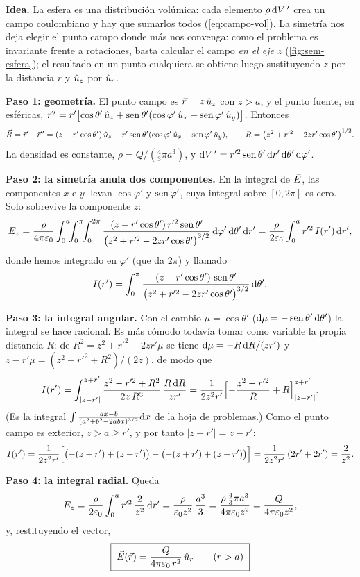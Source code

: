 \begin{resolucion}
\textbf{Idea.} La esfera es una distribución volúmica: cada elemento $\rho\,\mathrm{d} V\,'$ crea un campo coulombiano y hay que sumarlos todos (\cref{eq:campo-vol}). La simetría nos deja elegir el
punto campo donde más nos convenga: como el problema es invariante frente a rotaciones, basta calcular el campo \emph{en el eje $z$} (\cref{fig:sem-esfera}); el resultado en un punto
cualquiera se obtiene luego sustituyendo $z$ por la distancia $r$ y $\hat{u}_{z}$ por $\hat{u}_{r}$.

\textbf{Paso 1: geometría.} El punto campo es $\vec{r}=z\,\hat{u}_{z}$ con $z>a$, y el punto fuente, en esféricas,
$\vec{r}\,'=r'\bigl[\cos\theta'\,\hat{u}_{z}+\operatorname{sen}\theta'(\cos\varphi'\,\hat{u}_{x}+\operatorname{sen}\varphi'\,\hat{u}_{y})\bigr]$. Entonces
\[
  \vec{R}=\vec{r}-\vec{r}\,'=(z-r'\cos\theta')\,\hat{u}_{z}-r'\operatorname{sen}\theta'(\cos\varphi'\,\hat{u}_{x}+\operatorname{sen}\varphi'\,\hat{u}_{y}),\qquad
  R=\bigl(z^{2}+r'^{2}-2zr'\cos\theta'\bigr)^{1/2}.
\]
La densidad es constante, $\rho=Q/(\tfrac43\pi a^{3})$, y $\mathrm{d} V\,'=r'^{2}\operatorname{sen}\theta'\,\mathrm{d} r'\,\mathrm{d}\theta'\,\mathrm{d}\varphi'$.

\textbf{Paso 2: la simetría anula dos componentes.} En la integral de $\vec{E}$, las componentes $x$ e $y$ llevan $\cos\varphi'$ y $\operatorname{sen}\varphi'$, cuya integral sobre $[0,2\pi]$ es cero. Solo
sobrevive la componente $z$:
\[
  E_z=\frac{\rho}{4\pi\varepsilon_{0}}\int_{0}^{a}\!\!\int_{0}^{\pi}\!\!\int_{0}^{2\pi}\frac{(z-r'\cos\theta')\,r'^{2}\operatorname{sen}\theta'}{\bigl(z^{2}+r'^{2}-2zr'\cos\theta'\bigr)^{3/2}}\,\mathrm{d}\varphi'\,\mathrm{d}\theta'\,\mathrm{d} r'
  =\frac{\rho}{2\varepsilon_{0}}\int_{0}^{a}r'^{2}\,I(r')\,\mathrm{d} r',
\]
donde hemos integrado en $\varphi'$ (que da $2\pi$) y llamado
\[
  I(r')=\int_{0}^{\pi}\frac{(z-r'\cos\theta')\,\operatorname{sen}\theta'}{\bigl(z^{2}+r'^{2}-2zr'\cos\theta'\bigr)^{3/2}}\,\mathrm{d}\theta' .
\]

\textbf{Paso 3: la integral angular.} Con el cambio $\mu=\cos\theta'$ ($\mathrm{d}\mu=-\operatorname{sen}\theta'\,\mathrm{d}\theta'$) la integral se hace racional. Es más cómodo todavía tomar como variable la propia distancia
$R$: de $R^{2}=z^{2}+r'^{2}-2zr'\mu$ se tiene $\mathrm{d}\mu=-R\,\mathrm{d} R/(zr')$ y $z-r'\mu=(z^{2}-r'^{2}+R^{2})/(2z)$, de modo que
\[
  I(r')=\int_{|z-r'|}^{z+r'}\frac{z^{2}-r'^{2}+R^{2}}{2z\,R^{3}}\,\frac{R\,\mathrm{d} R}{zr'}
  =\frac{1}{2z^{2}r'}\Bigl[-\frac{z^{2}-r'^{2}}{R}+R\Bigr]_{|z-r'|}^{z+r'} .
\]
(Es la integral $\int\frac{ax-b}{(a^{2}+b^{2}-2abx)^{3/2}}\mathrm{d} x$ de la hoja de problemas.) Como el punto campo es exterior, $z>a\ge r'$, y por tanto $|z-r'|=z-r'$:
\[
  I(r')=\frac{1}{2z^{2}r'}\Bigl[\bigl(-(z-r')+(z+r')\bigr)-\bigl(-(z+r')+(z-r')\bigr)\Bigr]=\frac{1}{2z^{2}r'}\,(2r'+2r')=\frac{2}{z^{2}} .
\]

\textbf{Paso 4: la integral radial.} Queda
\[
  E_z=\frac{\rho}{2\varepsilon_{0}}\int_{0}^{a}r'^{2}\,\frac{2}{z^{2}}\,\mathrm{d} r'=\frac{\rho}{\varepsilon_{0} z^{2}}\,\frac{a^{3}}{3}=\frac{\rho\,\frac43\pi a^{3}}{4\pi\varepsilon_{0} z^{2}}=\frac{Q}{4\pi\varepsilon_{0} z^{2}},
\]
y, restituyendo el vector,
\[
  \boxed{\;\vec{E}(\vec{r})=\frac{Q}{4\pi\varepsilon_{0}\,r^{2}}\,\hat{u}_{r}\qquad(r>a)\;}
\]
\end{resolucion}

